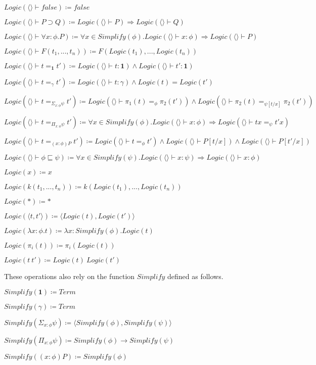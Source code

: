 \documentclass[12pt,a4paper,titlepage]{article}
\newcommand{\lnc}[1]{Logic(\langle \rangle \vdash #1)}
\begin{document}
    $\lnc{false} \coloneqq false$

    $\lnc{P \supset Q} \coloneqq \lnc{P} \Rightarrow \lnc{Q}$

    $\lnc{\forall x: \phi . P} \coloneqq \forall x \in Simplify(\phi) . \lnc{x: \phi} \Rightarrow \lnc{P}$

    $\lnc{F(t_1, ..., t_n)} \coloneqq F(Logic(t_1), ..., Logic(t_n))$

    $\lnc{t =_\textbf{1} t'} \coloneqq \lnc{t: \textbf{1}} \land \lnc{t': \textbf{1}}$

    $\lnc{t =_\gamma t'} \coloneqq \lnc{t: \gamma} \land Logic(t) = Logic(t')$

    $\lnc{t =_{\Sigma_{x: \phi} \psi} t'} \coloneqq
    \lnc{\pi_1 (t) =_\phi \pi_2 (t')} \land \lnc{\pi_2 (t) =_{\psi[t/x]} \pi_2 (t')}$

    $\lnc{t =_{\Pi_{x: \phi} \psi} t'} \coloneqq
    \forall x \in Simplify(\phi) . \lnc{x: \phi} \Rightarrow \lnc{tx =_\psi t'x}$

    $\lnc{t =_{(x: \phi)P} t'} \coloneqq \lnc{t =_\phi t'} \land \lnc{P[t/x]} \land \lnc{P[t'/x]}$

    $\lnc{\phi \sqsubseteq \psi} \coloneqq \forall x \in Simplify(\psi) . \lnc{x: \psi} \Rightarrow \lnc{x: \phi}$

    $Logic(x) \coloneqq x$

    $Logic(k(t_1, ..., t_n)) \coloneqq k(Logic(t_1), ..., Logic(t_n))$

    $Logic(\ast) \coloneqq \ast$

    $Logic(\langle t, t' \rangle) \coloneqq \langle Logic(t), Logic(t') \rangle$

    $Logic(\lambda x: \phi . t) \coloneqq \lambda x: Simplify(\phi) . Logic(t)$

    $Logic(\pi_i (t)) \coloneqq \pi_i (Logic(t))$

    $Logic(t\ t') \coloneqq Logic(t)\ Logic(t')$

    These operations also rely on the function $Simplify$ defined as follows.

    $Simplify(\textbf{1}) \coloneqq Term$

    $Simplify(\gamma) \coloneqq Term$

    $Simplify(\Sigma_{x: \phi} \psi) \coloneqq \langle Simplify(\phi), Simplify(\psi) \rangle$

    $Simplify(\Pi_{x: \phi} \psi) \coloneqq Simplify(\phi) \rightarrow Simplify(\psi)$

    $Simplify((x: \phi)P) \coloneqq Simplify(\phi)$
\end{document}
